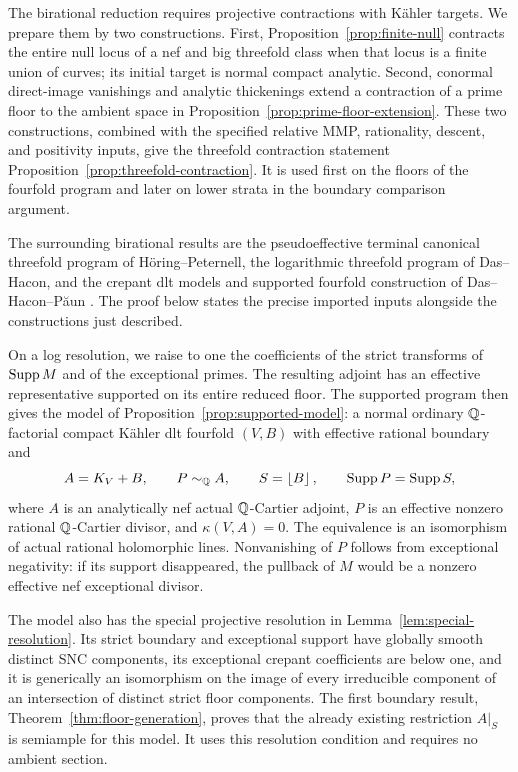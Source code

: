 The birational reduction requires projective contractions with
K\"ahler targets.  We prepare them by two constructions.  First,
Proposition~\ref{prop:finite-null} contracts the entire null locus of a
nef and big threefold class when that locus is a finite union of curves;
its initial target is normal compact analytic.  Second, conormal
direct-image vanishings and analytic thickenings extend a contraction of
a prime floor to the ambient space in
Proposition~\ref{prop:prime-floor-extension}.  These two constructions,
combined with the specified relative MMP, rationality, descent, and
positivity inputs, give the threefold contraction statement
Proposition~\ref{prop:threefold-contraction}.  It is used first on the
floors of the fourfold program and later on lower strata in the boundary
comparison argument.

The surrounding birational results are the pseudoeffective terminal
canonical threefold program of H\"oring--Peternell, the logarithmic
threefold program of Das--Hacon, and the crepant dlt models and supported
fourfold construction of Das--Hacon--P\u{a}un
\cite{HoeringPeternell2016,DasHacon2024,DasHaconPaun2024}.
The proof below states the precise imported inputs alongside the
constructions just described.

On a log resolution, we raise to one the coefficients of the strict
transforms of \(\operatorname{Supp} M\) and of the exceptional primes.  The resulting
adjoint has an effective representative supported on its entire reduced
floor.  The supported program then gives the model of
Proposition~\ref{prop:supported-model}: a normal ordinary
\(\mathbb Q\)-factorial compact K\"ahler dlt fourfold \((V,B)\) with effective
rational boundary and
\[
 A=K_V+B,\qquad P\sim_\mathbb Q A,\qquad S=\left\lfloor B\right\rfloor,\qquad
 \operatorname{Supp} P=\operatorname{Supp} S,
\]
where \(A\) is an analytically nef actual \(\mathbb Q\)-Cartier adjoint,
\(P\) is an effective nonzero rational
\(\mathbb Q\)-Cartier divisor, and \(\kappa(V,A)=0\).  The equivalence is an
isomorphism of actual rational holomorphic lines.  Nonvanishing of \(P\)
follows from exceptional negativity: if its support disappeared, the
pullback of \(M\) would be a nonzero effective nef exceptional divisor.

The model also has the special projective resolution in
Lemma~\ref{lem:special-resolution}.  Its strict boundary and exceptional
support have globally smooth distinct SNC components, its exceptional
crepant coefficients are below one, and it is generically an isomorphism
on the image of every irreducible component of an intersection of distinct
strict floor components.
The first boundary result, Theorem~\ref{thm:floor-generation}, proves
that the already existing restriction \(A|_S\) is semiample for this
model.  It uses this resolution condition and requires no ambient
section.


